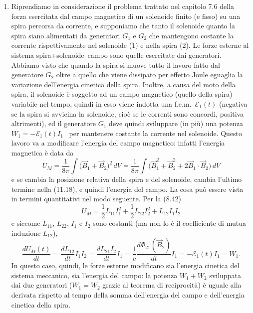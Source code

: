 \begin{enumerate}
  \item Riprendiamo in considerazione il problema trattato nel capitolo 7.6
    della forza esercitata dal campo magnetico di un solenoide finito (e fisso)
    su una spira percorsa da corrente, e supponiamo che tanto il solenoide
    quanto la spira siano alimentati da generatori $G_1$ e $G_2$ che mantengono
    costante la corrente rispettivamente nel solenoide (1) e nella spira (2). Le
    forze esterne al sistema spira+solenoide--campo sono quelle esercitate dai
    generatori. Abbiamo visto che quando la spira si muove tutto il lavoro fatto
    dal generatore $G_2$ oltre a quello che viene dissipato per effetto Joule
    eguaglia la variazione dell'energia cinetica della spira. Inoltre, a causa
    del moto della spira, il solenoide \`e soggetto ad un campo magnetico
    (quello della spira) variabile nel tempo, quindi in esso viene indotta una
    f.e.m.\ $\mathcal E_1(t)$ (negativa se la spira si avvicina la solenoide,
    cio\`e se le correnti sono concordi, positiva altrimenti), ed il generatore
    $G_1$ deve quindi sviluppare (in pi\`u) una potenza
    \ $W_1=-\mathcal E_1(t)I_1$ \ per mantenere costante la corrente nel
    solenoide. Questo lavoro va a modificare l'energia del campo magnetico:
    infatti l'energia magnetica \`e data da
    \begin{equation}
      U_M=\frac{1}{8\pi}\int\big(\vec B_1+\vec B_2\big)^2\,dV=\frac{1}{8\pi}
      \int\big(\vec B_1^2+\vec B_2^2+2\vec B_1\cdot\vec B_2\big)\,dV
      \tag{11.18}
    \end{equation}
    e se cambia la posizione relativa della spira e del solenoide, cambia
    l'ultimo termine nella (11.18), e quindi l'energia del campo. La cosa pu\`o
    essere vista in termini quantitativi nel modo seguente. Per la (8.42)
    \begin{equation}
      U_M=\frac{1}{2}L_{11}I_1^2+\frac{1}{2}L_{22}I_2^2+L_{12}I_1I_2
      \tag{11.19}
    \end{equation}
    e siccome $L_{11}$, $L_{22}$, $I_1$ e $I_2$ sono costanti (ma non lo \`e il
    coefficiente di mutua induzione $L_{12}$),
    \begin{equation}
      \frac{dU_M(t)}{dt}=\frac{dL_{12}}{dt}I_1I_2=\frac{dL_{21}I_2}{dt}I_1
      =\frac{1}{c}\frac{d\Phi_{21}(\vec B_2)}{dt}I_1=-\mathcal E_1(t)I_1=W_1.
      \tag{11.20}
    \end{equation}
    In questo caso, quindi, le forze esterne modificano sia l'energia cinetica
    del sistema meccanico, sia l'energia del campo: la potenza $W_1+W_2$
    sviluppata dai due generatori ($W_1=W_2$ grazie al teorema di reciprocit\`a)
    \`e uguale alla derivata rispetto al tempo della somma dell'energia del
    campo e dell'energia cinetica della spira.


\end{enumerate}
